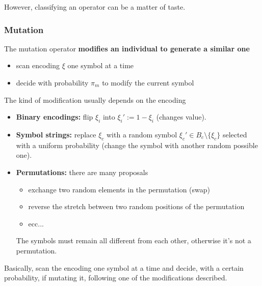 \documentclass[11pt]{article}
\begin{document}
	However, classifying an operator can be a matter of taste.\\
	
	\newpage
	
	\subsubsection{Mutation}
	
	The mutation operator \textbf{modifies an individual to generate a similar one}
	\begin{itemize}
		\item scan encoding $\xi$ one symbol at a time
		\item decide with probability $\pi_m$ to modify the current symbol
	\end{itemize}
	
	The kind of modification usually depends on the encoding
	\begin{itemize}
		\item \textbf{Binary encodings:} flip $\xi_i$ into $\xi_i' := 1 − \xi_i$ (changes value).\\
		
		\item \textbf{Symbol strings:} replace $\xi_c$ with a random symbol $\xi_c' \in B_c \setminus \{\xi_c \}$ selected with a uniform probability (change the symbol with another random possible one).\\
		
		\item \textbf{Permutations:} there are many proposals
		\begin{itemize}
			\item exchange two random elements in the permutation (swap)
			\item reverse the stretch between two random positions of the permutation
			\item ecc...
		\end{itemize}
		The symbols must remain all different from each other, otherwise it's not a permutation.\\
	\end{itemize}
	
	Basically, scan the encoding one symbol at a time and decide, with a certain probability, if mutating it, following one of the modifications described.\\
	
\end{document}
